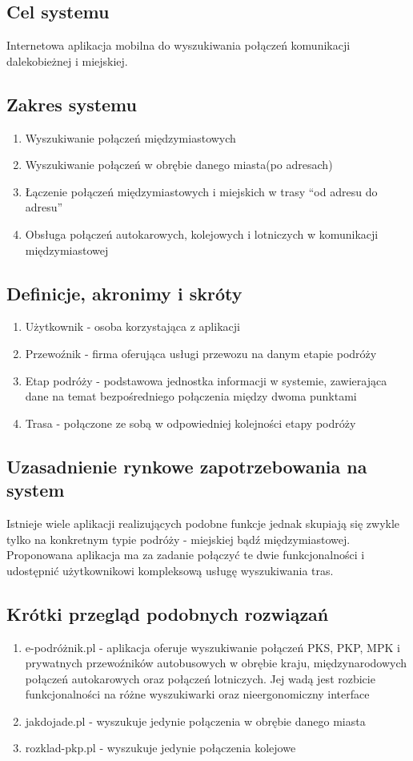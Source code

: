 \documentclass[12pt,a4paper]{report}
\begin{document}
\subsection{Cel systemu}
	Internetowa aplikacja mobilna do wyszukiwania połączeń komunikacji dalekobieżnej i miejskiej.
\subsection{Zakres systemu}
\begin{enumerate}
	\item Wyszukiwanie połączeń międzymiastowych
	\item Wyszukiwanie połączeń w obrębie danego miasta(po adresach)
	\item Łączenie połączeń międzymiastowych i miejskich w trasy “od adresu do adresu”
	\item Obsługa połączeń autokarowych, kolejowych i lotniczych w komunikacji międzymiastowej
\end{enumerate}
\subsection{Definicje, akronimy i skróty}
\begin{enumerate}
	\item Użytkownik - osoba korzystająca z aplikacji
	\item Przewoźnik - firma oferująca usługi przewozu na danym etapie podróży
	\item Etap podróży - podstawowa jednostka informacji w systemie, zawierająca dane na temat bezpośredniego połączenia między dwoma punktami
	\item Trasa - połączone ze sobą w odpowiedniej kolejności etapy podróży
\end{enumerate}
\subsection{Uzasadnienie rynkowe zapotrzebowania na system}
	Istnieje wiele aplikacji realizujących podobne funkcje jednak skupiają się zwykle tylko na konkretnym typie podróży - miejskiej bądź międzymiastowej. Proponowana aplikacja ma za zadanie połączyć te dwie funkcjonalności i udostępnić użytkownikowi kompleksową usługę wyszukiwania tras. 
\subsection{Krótki przegląd podobnych rozwiązań}
\begin{enumerate}
	\item e-podróżnik.pl - aplikacja oferuje wyszukiwanie połączeń PKS, PKP, MPK i prywatnych przewoźników autobusowych w obrębie kraju, międzynarodowych połączeń autokarowych oraz połączeń lotniczych. Jej wadą jest rozbicie funkcjonalności na różne wyszukiwarki oraz nieergonomiczny interface
	\item jakdojade.pl - wyszukuje jedynie połączenia w obrębie danego miasta
	\item rozklad-pkp.pl - wyszukuje jedynie połączenia kolejowe
\end{enumerate}
\end{document}
